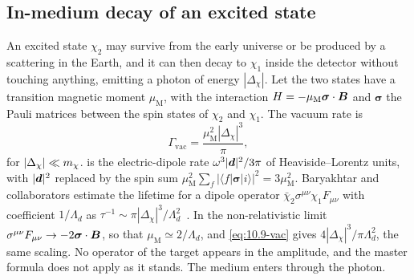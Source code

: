 \subsection{In-medium decay of an excited state}\label{sec:10.9-decay}

An excited state $\chi_2$ may survive from the early universe or be produced by a scattering in the Earth, and it can then decay to $\chi_1$ inside the detector without touching anything, emitting a photon of energy $|\Delta_\chi|$. Let the two states have a transition magnetic moment $\mu_{\mathrm{M}}$, with the interaction $H = -\mu_{\mathrm{M}}\boldsymbol{\sigma}\cdot\bm{B}$ and $\boldsymbol{\sigma}$ the Pauli matrices between the spin states of $\chi_2$ and $\chi_1$. The vacuum rate is
\begin{equation}
  \varGamma_{\mathrm{vac}} = \frac{\mu_{\mathrm{M}}^2|\Delta_\chi|^3}{\pi} ,
  \label{eq:10.9-vac}
\end{equation}
for $|\Delta_\chi| \ll m_{\chi}$.  is the electric-dipole rate $\omega^3|\bm{d}|^2/3\pi$ of Heaviside--Lorentz units, with $|\bm{d}|^2$ replaced by the spin sum $\mu_{\mathrm{M}}^2\sum_f|\langle f|\boldsymbol{\sigma}|i\rangle|^2 = 3\mu_{\mathrm{M}}^2$. Baryakhtar and collaborators estimate the lifetime for a dipole operator $\bar\chi_2\sigma^{\mu\nu}\chi_1F_{\mu\nu}$ with coefficient $1/\Lambda_d$ as $\tau^{-1} \sim \pi|\Delta_\chi|^3/\Lambda_d^2$~\cite[Eqs.~(2.1) and (2.2)]{baryakhtar2020electromagnetic}. In the non-relativistic limit $\sigma^{\mu\nu}F_{\mu\nu} \to -2\boldsymbol{\sigma}\cdot\bm{B}$, so that $\mu_{\mathrm{M}} \simeq 2/\Lambda_d$, and \cref{eq:10.9-vac} gives $4|\Delta_\chi|^3/\pi\Lambda_d^2$, the same scaling. No operator of the target appears in the amplitude, and the master formula does not apply as it stands. The medium enters through the photon.

